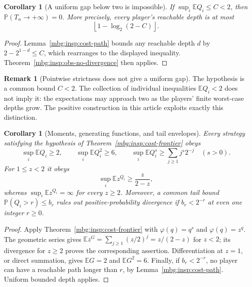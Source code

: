 \documentclass[11pt,letterpaper]{article}
\newtheorem{corollary}[theorem]{Corollary}
\theoremstyle{definition}
\newtheorem{remark}[theorem]{Remark}
\newcommand{\E}{\mathbb E}
\newcommand{\Prb}{\mathbb P}
\begin{document}
\begin{corollary}[A uniform gap below two is impossible]
\label{mbg:insp:cost-mean}
If $\sup_i\E Q_i\le C<2$, then
$\Prb(T_n\to+\infty)=0$.  More precisely, every player's reachable
depth is at most
\[
 \left\lfloor1-\log_2(2-C)\right\rfloor.
\]
\end{corollary}

\begin{proof}
Lemma~\ref{mbg:insp:cost-path} bounds any reachable depth $d$ by
$2-2^{1-d}\le C$, which rearranges to the displayed inequality.
Theorem~\ref{mbg:insp:obs-no-divergence} then applies.
\end{proof}

\begin{remark}[Pointwise strictness does not give a uniform gap]
\label{mbg:insp:cost-strictness}
The hypothesis is a common bound $C<2$.  The collection of individual
inequalities $\E Q_i<2$ does not imply it: the expectations may
approach two as the players' finite worst-case depths grow.  The
positive construction in this article exploits exactly this
distinction.
\end{remark}

\begin{corollary}[Moments, generating functions, and tail envelopes]
\label{mbg:insp:cost-moments}
Every strategy satisfying the hypothesis of
Theorem~\ref{mbg:insp:cost-frontier} obeys
\[
 \sup_i\E Q_i\ge2,
 \qquad \sup_i\E Q_i^2\ge6,
 \qquad
 \sup_i\E Q_i^s\ge\sum_{j\ge1}j^s2^{-j}\quad(s>0).
\]
For $1\le z<2$ it obeys
\[
 \sup_i\E z^{Q_i}\ge\frac{z}{2-z},
\]
whereas $\sup_i\E z^{Q_i}=\infty$ for every $z\ge2$.
Moreover, a common tail bound
$\Prb(Q_i>r)\le b_r$ rules out positive-probability divergence if
$b_r<2^{-r}$ at even one integer $r\ge0$.
\end{corollary}

\begin{proof}
Apply Theorem~\ref{mbg:insp:cost-frontier} with $\varphi(q)=q^s$ and
$\varphi(q)=z^q$.  The geometric series gives
$\E z^G=\sum_{j\ge1}(z/2)^j=z/(2-z)$ for $z<2$; its divergence
for $z\ge2$ proves the corresponding assertion.  Differentiation at
$z=1$, or direct summation, gives $\E G=2$ and $\E G^2=6$.
Finally, if $b_r<2^{-r}$, no player can have a reachable path longer
than $r$, by Lemma~\ref{mbg:insp:cost-path}.  Uniform bounded depth applies.
\end{proof}
\end{document}
